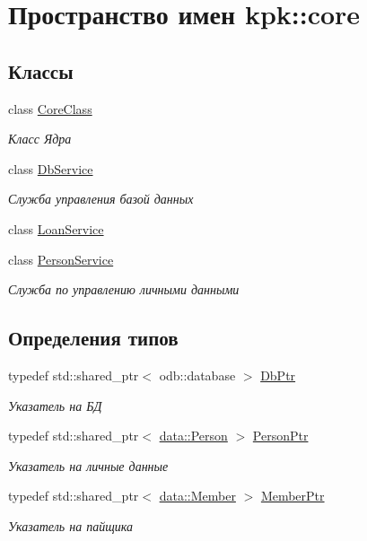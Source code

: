 \hypertarget{namespacekpk_1_1core}{}\section{Пространство имен kpk\+:\+:core}
\label{namespacekpk_1_1core}
\subsection*{Классы}
\begin{DoxyCompactItemize}
\item 
class \hyperlink{classkpk_1_1core_1_1_core_class}{Core\+Class}
\begin{DoxyCompactList}\small\item\em Класс Ядра \end{DoxyCompactList}\item 
class \hyperlink{classkpk_1_1core_1_1_db_service}{Db\+Service}
\begin{DoxyCompactList}\small\item\em Служба управления базой данных \end{DoxyCompactList}\item 
class \hyperlink{classkpk_1_1core_1_1_loan_service}{Loan\+Service}
\item 
class \hyperlink{classkpk_1_1core_1_1_person_service}{Person\+Service}
\begin{DoxyCompactList}\small\item\em Служба по управлению личными данными \end{DoxyCompactList}\end{DoxyCompactItemize}
\subsection*{Определения типов}
\begin{DoxyCompactItemize}
\item 
typedef std\+::shared\+\_\+ptr$<$ odb\+::database $>$ \hyperlink{namespacekpk_1_1core_a466e66f45327171cc2976df1304573ab}{Db\+Ptr}
\begin{DoxyCompactList}\small\item\em Указатель на БД \end{DoxyCompactList}\item 
typedef std\+::shared\+\_\+ptr$<$ \hyperlink{classkpk_1_1data_1_1_person}{data\+::\+Person} $>$ \hyperlink{namespacekpk_1_1core_ab7506e35456bfb9d583bc7815bbb5ca4}{Person\+Ptr}
\begin{DoxyCompactList}\small\item\em Указатель на личные данные \end{DoxyCompactList}\item 
typedef std\+::shared\+\_\+ptr$<$ \hyperlink{classkpk_1_1data_1_1_member}{data\+::\+Member} $>$ \hyperlink{namespacekpk_1_1core_a51190e5694e0b82ddd1e02382ddd9586}{Member\+Ptr}
\begin{DoxyCompactList}\small\item\em Указатель на пайщика \end{DoxyCompactList}\end{DoxyCompactItemize}
